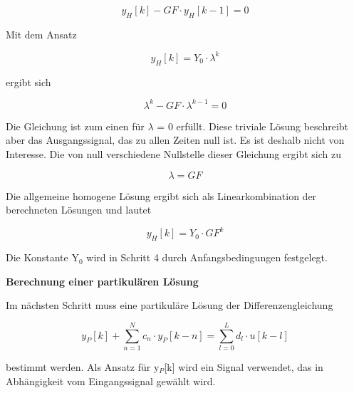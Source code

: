 \begin{equation}\label{eq:fourfiftyfour}
y_{H} \left[k\right]-GF\cdot y_{H} \left[k-1\right]=0
\end{equation}

\noindent Mit dem Ansatz

\begin{equation}\label{eq:fourfiftyfive}
y_{H} \left[k\right]=Y_{0} \cdot \lambda ^{k}
\end{equation}

\noindent ergibt sich

\begin{equation}\label{eq:fourfiftysix}
\lambda ^{k} -GF\cdot \lambda ^{k-1} =0
\end{equation}

\noindent Die Gleichung ist zum einen f\"{u}r $\lambda$ = 0 erf\"{u}llt. Diese triviale L\"{o}sung beschreibt aber das Ausgangssignal, das zu allen Zeiten null ist. Es ist deshalb nicht von Interesse. Die von null verschiedene Nullstelle dieser Gleichung ergibt sich zu

\begin{equation}\label{eq:fourfiftyseven}
\lambda =GF
\end{equation}

\noindent Die allgemeine homogene L\"{o}sung ergibt sich als Linearkombination der berechneten L\"{o}sungen und lautet 

\begin{equation}\label{eq:fourfiftyeight}
y_{H} \left[k\right]=Y_{0} \cdot GF^{k}
\end{equation}

\noindent Die Konstante Y${}_{0}$ wird in Schritt 4 durch Anfangsbedingungen festgelegt.\bigskip

{\selectfont
\noindent\textbf{Berechnung einer partikulären Lösung}} \smallskip

\noindent Im n\"{a}chsten Schritt muss eine partikul\"{a}re L\"{o}sung der Differenzengleichung

\begin{equation}\label{eq:fourfiftynine}
y_{P} \left[k\right]+\sum _{n=1}^{N}c_{n} \cdot y_{P} \left[k-n\right] =\sum _{l=0}^{L}d_{l} \cdot u\left[k-l\right]
\end{equation}

\noindent bestimmt werden. Als Ansatz f\"{u}r y${}_{P}$[k] wird ein Signal verwendet, das in Abh\"{a}ngigkeit vom Eingangssignal gew\"{a}hlt wird.


